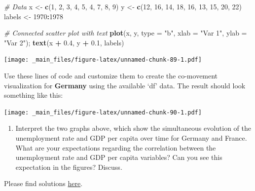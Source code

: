 \documentclass[
  12pt,
  oneside]{book}
\newenvironment{Shaded}{\begin{snugshade}}{\end{snugshade}}
\newcommand{\AttributeTok}[1]{\textcolor[rgb]{0.13,0.29,0.53}{#1}}
\newcommand{\CommentTok}[1]{\textcolor[rgb]{0.56,0.35,0.01}{\textit{#1}}}
\newcommand{\DecValTok}[1]{\textcolor[rgb]{0.00,0.00,0.81}{#1}}
\newcommand{\FloatTok}[1]{\textcolor[rgb]{0.00,0.00,0.81}{#1}}
\newcommand{\FunctionTok}[1]{\textcolor[rgb]{0.13,0.29,0.53}{\textbf{#1}}}
\newcommand{\NormalTok}[1]{#1}
\newcommand{\OtherTok}[1]{\textcolor[rgb]{0.56,0.35,0.01}{#1}}
\newcommand{\SpecialCharTok}[1]{\textcolor[rgb]{0.81,0.36,0.00}{\textbf{#1}}}
\newcommand{\StringTok}[1]{\textcolor[rgb]{0.31,0.60,0.02}{#1}}
\providecommand{\tightlist}{%
  \setlength{\itemsep}{0pt}\setlength{\parskip}{0pt}}
\theoremstyle{definition}
\theoremstyle{definition}
\theoremstyle{definition}
\theoremstyle{definition}
\theoremstyle{remark}
\begin{document}
\begin{Shaded}
\begin{Highlighting}[]
\CommentTok{\# Data}
\NormalTok{x }\OtherTok{\textless{}{-}} \FunctionTok{c}\NormalTok{(}\DecValTok{1}\NormalTok{, }\DecValTok{2}\NormalTok{, }\DecValTok{3}\NormalTok{, }\DecValTok{4}\NormalTok{, }\DecValTok{5}\NormalTok{, }\DecValTok{4}\NormalTok{, }\DecValTok{7}\NormalTok{, }\DecValTok{8}\NormalTok{, }\DecValTok{9}\NormalTok{)}
\NormalTok{y }\OtherTok{\textless{}{-}} \FunctionTok{c}\NormalTok{(}\DecValTok{12}\NormalTok{, }\DecValTok{16}\NormalTok{, }\DecValTok{14}\NormalTok{, }\DecValTok{18}\NormalTok{, }\DecValTok{16}\NormalTok{, }\DecValTok{13}\NormalTok{, }\DecValTok{15}\NormalTok{, }\DecValTok{20}\NormalTok{, }\DecValTok{22}\NormalTok{)}
\NormalTok{labels }\OtherTok{\textless{}{-}} \DecValTok{1970}\SpecialCharTok{:}\DecValTok{1978}

\CommentTok{\# Connected scatter plot with text}
\FunctionTok{plot}\NormalTok{(x, y, }\AttributeTok{type =} \StringTok{"b"}\NormalTok{, }\AttributeTok{xlab =} \StringTok{"Var 1"}\NormalTok{, }\AttributeTok{ylab =} \StringTok{"Var 2"}\NormalTok{); }\FunctionTok{text}\NormalTok{(x }\SpecialCharTok{+} \FloatTok{0.4}\NormalTok{, y }\SpecialCharTok{+} \FloatTok{0.1}\NormalTok{, labels) }
\end{Highlighting}
\end{Shaded}

\texttt{[image: \_main\_files/figure-latex/unnamed-chunk-89-1.pdf]}

Use these lines of code and customize them to create the co-movement visualization for \textbf{Germany} using the available `df' data.
The result should look something like this:

\texttt{[image: \_main\_files/figure-latex/unnamed-chunk-90-1.pdf]}

\begin{enumerate}
\def\labelenumi{(\arabic{enumi})}
\setcounter{enumi}{23}
\tightlist
\item
  Interpret the two graphs above, which show the simultaneous evolution of the unemployment rate and GDP per capita over time for Germany and France. What are your expectations regarding the correlation between the unemployment rate and GDP per capita variables? Can you see this expectation in the figures? Discuss.
\end{enumerate}

Please find solutions \href{https://raw.githubusercontent.com/hubchev/courses/main/scr/un_gdp_ger_fra.R}{here}.
\end{document}
